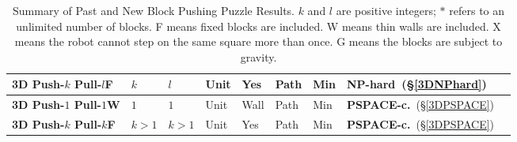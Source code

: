 \begin{table}
{\begin{tabular}{|l|l|l|l|l|l|l|l|l|}
\textbf{3D Push-$k$ Pull-$l$F} & $k$ & $l$ & Unit & Yes & Path & Min &  \textbf{NP-hard}\ (\S  \ref{3DNPhard}) \\ \hline
\textbf{3D Push-$1$ Pull-$1$W} & $1$ & $1$ & Unit & Wall & Path & Min &  \textbf{PSPACE-c.}\ (\S  \ref{3DPSPACE}) \\ \hline
\textbf{3D Push-$k$ Pull-$k$F} & $k > 1$ & $k >1$ & Unit & Yes & Path & Min &  \textbf{PSPACE-c.}\ (\S  \ref{3DPSPACE}) \\ \hline
\end{tabular}
}
\caption{Summary of Past and New Block Pushing Puzzle Results. $k$ and $l$ are positive integers; $*$ refers to an unlimited number of blocks. F means fixed blocks are included. W means thin walls are included. X means the robot cannot step on the same square more than once. G means the blocks are subject to gravity.}
\label{BlocksTable}
\end{table}

